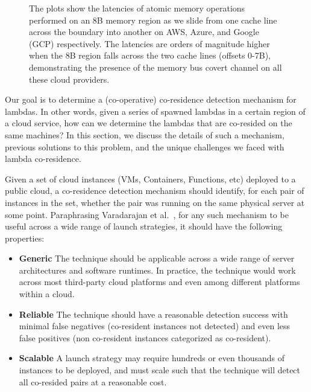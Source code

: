 \begin{figure}[h!]
\begin{subfigure}{.33\textwidth}
\end{subfigure}
\caption{The plots show the latencies of atomic memory operations performed on
        an 8B memory region as we slide from one cache line across the boundary into
        another on AWS, Azure, and Google (GCP) respectively.  The latencies are orders
        of magnitude higher when the 8B region falls across the two cache lines (offsets
        0-7B), demonstrating the presence of the memory bus covert channel on all these
        cloud providers. \label{fig:membus_clouds}}
\label{fig:fig}
\end{figure}


Our goal is to determine a (co-operative) co-residence detection mechanism for
lambdas. In other words, given a series of spawned lambdas in a
certain region of a cloud service, how can we determine the lambdas that are
co-resided on the same machines?  In this section, we discuss the details of
such a mechanism, previous solutions to this problem, and the unique challenges
we faced with lambda co-residence.

Given a set of cloud instances (VMs, Containers, Functions, etc) deployed to a
public cloud, a co-residence detection mechanism should identify, for each pair
of instances in the set, whether the pair was running on the same physical
server at some point. Paraphrasing Varadarajan et al.~\cite{varadarajan2015},
for any such mechanism to be useful across a wide range of launch strategies, it
should have the following properties:

\begin{itemize}
    \item \textbf{Generic} The technique should be applicable across a wide
    range of server architectures and software runtimes. In practice, the
    technique would work across most third-party cloud platforms and even among different
    platforms within a cloud.
    \item \textbf{Reliable} The technique should have a reasonable detection success
    with minimal false negatives (co-resident instances not detected) and even 
    less false positives (non co-resident instances categorized as co-resident).
    \item \textbf{Scalable} A launch strategy may require hundreds or even
    thousands of instances to be deployed, and must scale such that the
    technique will detect all co-resided pairs at a reasonable cost.
\end{itemize}

